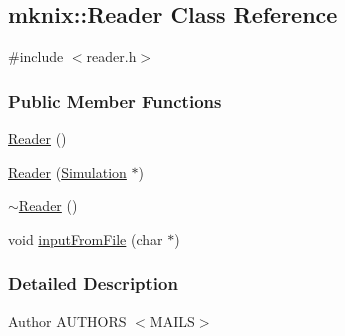 \hypertarget{classmknix_1_1_reader}{\subsection{mknix\-:\-:Reader Class Reference}
\label{classmknix_1_1_reader}
}


{\ttfamily \#include $<$reader.\-h$>$}

\subsubsection*{Public Member Functions}
\begin{DoxyCompactItemize}
\item 
\hyperlink{classmknix_1_1_reader_a6558002baf082327a804cad1ea3ae512}{Reader} ()
\item 
\hyperlink{classmknix_1_1_reader_af306d09fdfcd3675ae6c23aa2d5c1ece}{Reader} (\hyperlink{classmknix_1_1_simulation}{Simulation} $\ast$)
\item 
\hyperlink{classmknix_1_1_reader_a5aa850c593a547a1215a9425e45da74b}{$\sim$\-Reader} ()
\item 
void \hyperlink{classmknix_1_1_reader_ab8ac24c56853e5101ac4f2a94d172392}{input\-From\-File} (char $\ast$)
\end{DoxyCompactItemize}


\subsubsection{Detailed Description}
\begin{DoxyAuthor}{Author}
A\-U\-T\-H\-O\-R\-S $<$\-M\-A\-I\-L\-S$>$ 
\end{DoxyAuthor}


